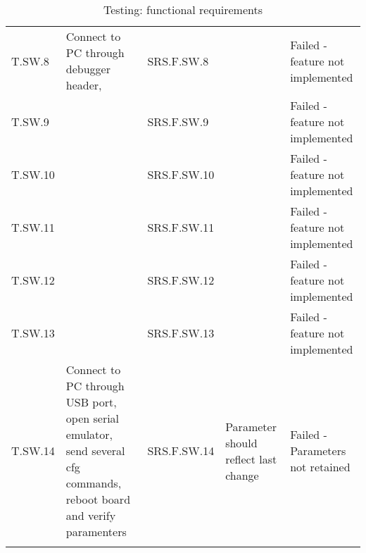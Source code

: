 \begin{table}[H]
\begin{tabular}{@{} >{\small}l >{\small}m{16em} >{\small}l  >{\small}m{12em}  >{\small}m{6em} @{}}
    T.SW.8  & Connect to PC through debugger header,  & SRS.F.SW.8       &   & Failed - feature not implemented \\ \addlinespace
    T.SW.9  &  & SRS.F.SW.9       &   & Failed - feature not implemented \\ \addlinespace
    T.SW.10 &  & SRS.F.SW.10       &   & Failed - feature not implemented \\ \addlinespace
    T.SW.11 &  & SRS.F.SW.11       &   & Failed - feature not implemented \\ \addlinespace
    T.SW.12 &  & SRS.F.SW.12       &   & Failed - feature not implemented \\ \addlinespace
    T.SW.13 &  & SRS.F.SW.13       &   & Failed - feature not implemented \\ \addlinespace
    T.SW.14 & Connect to PC through USB port, open serial emulator, send several cfg commands, reboot board and verify paramenters  & SRS.F.SW.14       & Parameter should reflect last change  & Failed - Parameters not retained \\ \addlinespace

    \bottomrule
\end{tabular}
\caption{Testing: functional requirements}\label{tab:test_f}
\end{table}
